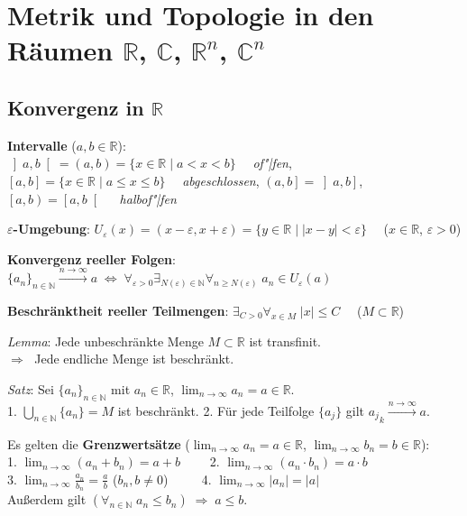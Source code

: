 \section{%
    Metrik und Topologie in den Räumen
    \texorpdfstring
    {$\mathbb{R}$, $\mathbb{C}$, $\mathbb{R}^n$, $\mathbb{C}^n$}%
    {ℝ, ℂ, ℝⁿ, ℂⁿ}%
}

\subsection{%
    \texorpdfstring{Konvergenz in $\mathbb{R}$}{Konvergenz in ℝ}%
}

\textbf{Intervalle} ($a, b \in \mathbb{R}$): \\
$\left]a,b\right[ = \left(a,b\right) =
\{x \in \mathbb{R} \;|\; a < x < b\} \quad$ \emph{of"|fen}, \\
$\left[a,b\right] =
\{x \in \mathbb{R} \;|\; a \le x \le b\} \quad$ \emph{abgeschlossen}, \qquad
$\left(a,b\right] = \left]a,b\right]$,
$\left[a,b\right) = \left[a,b\right[ \quad$ \emph{halbof"|fen}

\textbf{$\varepsilon$-Umgebung}: $U_\varepsilon(x) =
(x - \varepsilon, x + \varepsilon) =
\{y \in \mathbb{R} \;|\; |x - y| < \varepsilon\} \quad$
($x \in \mathbb{R}$, $\varepsilon > 0$)

\textbf{Konvergenz reeller Folgen}:
$\{a_n\}_{n \in \mathbb{N}} \xrightarrow{n \to \infty} a \;\Leftrightarrow\;
\forall_{\varepsilon > 0} \exists_{N(\varepsilon) \in \mathbb{N}}
\forall_{n \ge N(\varepsilon)}\; a_n \in U_\varepsilon(a)$

\textbf{Beschränktheit reeller Teilmengen}:
$\exists_{C > 0} \forall_{x \in M}\; |x| \le C \quad$ ($M \subset \mathbb{R}$)

\emph{Lemma}: Jede unbeschränkte Menge $M \subset \mathbb{R}$ ist
transfinit. \\
$\Rightarrow\;$ Jede endliche Menge ist beschränkt.

\emph{Satz}: Sei $\{a_n\}_{n \in \mathbb{N}}$ mit $a_n \in \mathbb{R}$,
$\lim_{n \to \infty} a_n = a \in \mathbb{R}$. \\
1. $\bigcup_{n \in \mathbb{N}} \{a_n\} = M$ ist beschränkt.
2. Für jede Teilfolge $\{a_j\}$ gilt ${a_j}_k \xrightarrow{n \to \infty} a$.

Es gelten die \textbf{Grenzwertsätze}
($\lim_{n \to \infty} a_n = a \in \mathbb{R}$,
$\lim_{n \to \infty} b_n = b \in \mathbb{R}$): \\
1. $\lim_{n \to \infty} (a_n + b_n) = a + b \qquad$
2. $\lim_{n \to \infty} (a_n \cdot b_n) = a \cdot b$ \\
3. $\lim_{n \to \infty} \frac{a_n}{b_n} = \frac{a}{b}$
($b_n, b \not= 0$) $\qquad$
4. $\lim_{n \to \infty} |a_n| = |a|$ \\
Außerdem gilt
$(\forall_{n \in \mathbb{N}}\; a_n \le b_n) \;\Rightarrow\; a \le b$.

